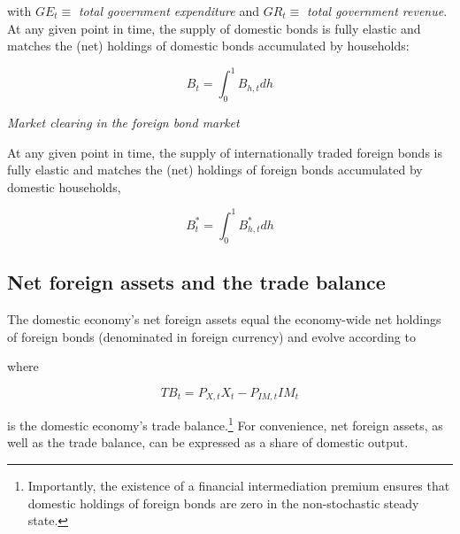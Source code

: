 \documentclass[a4paper,11pt]{article}
\numberwithin{equation}{section}
\begin{document}
	with $GE_t\equiv$ \textit{total government expenditure} and $GR_t\equiv$ \textit{total government revenue}. At any given point in time, the supply of domestic bonds is fully elastic and matches the (net) holdings of domestic bonds accumulated by households:
	
	\begin{equation}
	B_t=\int_{0}^{1}B_{h,t}dh
	\end{equation}
	
	\vspace{8pt}
	\textit{Market clearing in the foreign bond market}
	\vspace{8pt}
	
	At any given point in time, the supply of internationally traded foreign bonds is fully elastic and matches the (net) holdings of foreign bonds accumulated by domestic households,
	
	\begin{equation}
	B_t^*=\int_{0}^{1}B_{h,t}^*dh
	\end{equation}
	
	
	\subsection{Net foreign assets and the trade balance}
	
	The domestic economy's net foreign assets equal the economy-wide net holdings of foreign bonds (denominated in foreign currency) and evolve according to
	{}
	
	where
	
	\begin{equation} \label{trade_balance}
	TB_t=P_{X,t}X_t-P_{IM,t}IM_t
	\end{equation}
	
	is the domestic economy's trade balance.\footnote{Importantly, the existence of a financial intermediation premium ensures that domestic holdings of foreign bonds are zero in the non-stochastic steady state.} For convenience, net foreign assets, as well as the trade balance, can be expressed as a share of domestic output. 	{ }
	
\end{document}
